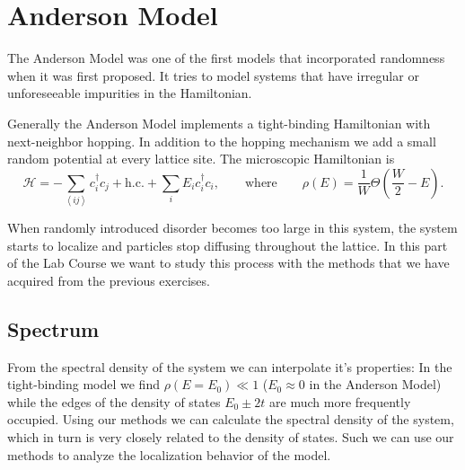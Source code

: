 \documentclass[../main.tex]{subfiles}
\begin{document}
\section{Anderson Model}

The Anderson Model was one of the first models that incorporated randomness when it was first proposed.
It tries to model systems that have irregular or unforeseeable impurities in the Hamiltonian.
\par

Generally the Anderson Model implements a tight-binding Hamiltonian with next-neighbor hopping.
In addition to the hopping mechanism we add a small random potential at every lattice site.
The microscopic Hamiltonian is 
\[
    \mathcal{H} = -\sum\limits_{\left<i j \right>}^{ } c_i^{\dagger} c_j + \text{h.c.}  + \sum_{i}^{ }  E_i c_i^{\dagger} c_i, 
    \qquad \text{where} \qquad
    \rho(E) = \frac{1}{W}\Theta\left( \frac{W}{2} - E \right)
.\] 

When randomly introduced disorder becomes too large in this system, the system starts to localize and particles stop diffusing throughout the lattice.
In this part of the Lab Course we want to study this process with the methods that we have acquired from the previous exercises.


\subsection{Spectrum}

From the spectral density of the system we can interpolate it's properties:
In the tight-binding model we find $\rho(E=E_0) \ll 1$ ($E_0 \approx 0$ in the Anderson Model) while the edges of the density of states $E_0 \pm 2t$ are much more frequently occupied.
Using our methods we can calculate the spectral density of the system, which in turn is very closely related to the density of states.
Such we can use our methods to analyze the localization behavior of the model.


\subsection{}



\ifSubfilesClassLoaded{
}{
    \newpage
}
\end{document}
